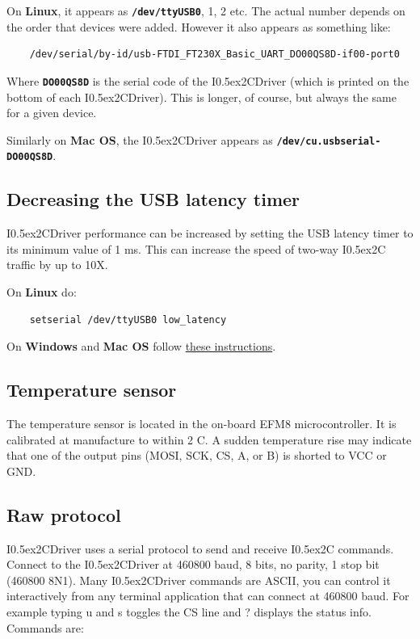 \documentclass{article}
\newcommand{\two}{\raise0.5ex\hbox{\footnotesize{2}}}
\newcommand{\iic}{I\two{}C}
\newcommand{\iicdriver}{I\two{}CDriver}
\newcommand{\mach}[1]{\texttt{\textbf{#1}}}
\begin{document}
On \textbf{Linux}, it appears as \mach{/dev/ttyUSB0}, 1, 2 etc.
The actual number depends on the order that devices were added.
However it also appears as something like:
\begin{lstlisting}
    /dev/serial/by-id/usb-FTDI_FT230X_Basic_UART_DO00QS8D-if00-port0
\end{lstlisting}
Where \mach{DO00QS8D} is the serial code of the \iicdriver{} (which is printed on the bottom of each \iicdriver{}).
This is longer, of course, but always the same for a given device.

Similarly on \textbf{Mac OS}, the \iicdriver{} appears as \mach{/dev/cu.usbserial-DO00QS8D}.

\subsection{Decreasing the USB latency timer}

\iicdriver{} performance can be increased by setting the USB latency timer to its minimum value of 1 ms.
This can increase the speed of two-way \iic{} traffic by up to 10X.

On \textbf{Linux} do:

\begin{lstlisting}
    setserial /dev/ttyUSB0 low_latency
\end{lstlisting}

On \textbf{Windows} and \textbf{Mac OS} follow
\href{https://projectgus.com/2011/10/notes-on-ftdi-latency-with-arduino/}{these instructions}.

\subsection{Temperature sensor}

The temperature sensor is located in the on-board EFM8 microcontroller.
It is calibrated at manufacture to within 2 C.
A sudden temperature rise may indicate that one of the output pins (MOSI, SCK, CS, A, or B) is shorted to VCC or GND.

\subsection{Raw protocol}

\iicdriver{} uses a serial protocol to send and receive \iic{} commands.
Connect to the \iicdriver{} at 460800 baud, 8 bits, no parity, 1 stop bit (460800 8N1).
Many \iicdriver{} commands are ASCII, you can control it
interactively from any terminal application that can connect at 460800
baud. For example typing u and s toggles the CS line and ? displays the
status info.
Commands are:
\end{document}
